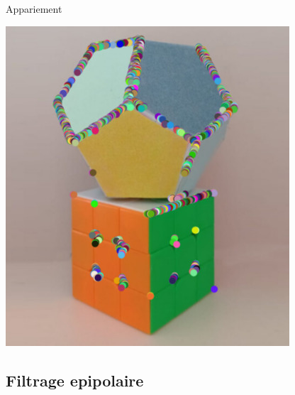 \begin{frame}{Appariement}
\begin{minipage}{0.48\linewidth}
    \includegraphics[width=\linewidth]{capture/test_detection_img2_1_moravec_2_500.jpeg}
  \end{minipage}
\end{frame}
\subsection{Filtrage epipolaire}

